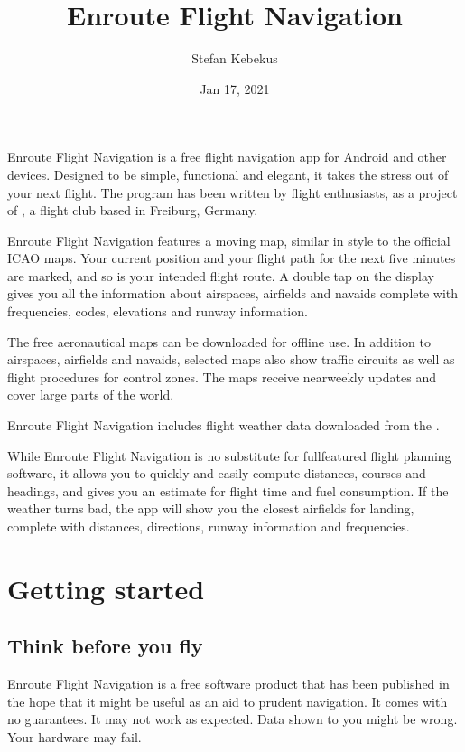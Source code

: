 \documentclass[letterpaper,10pt,english]{sphinxmanual}
\title{Enroute Flight Navigation}
\date{Jan 17, 2021}
\author{Stefan Kebekus}
\let\sphinxpxdimen\pdfpxdimen\else\newdimen\sphinxpxdimen
\begin{document}
\pagestyle{empty}
\sphinxmaketitle
\pagestyle{plain}
\sphinxtableofcontents
\pagestyle{normal}
\label{\detokenize{index::doc}}


\noindent{\hspace*{\fill}\sphinxincludegraphics[width=100\sphinxpxdimen]{{de.akaflieg_freiburg.enroute}.png}\hspace*{\fill}}

Enroute Flight Navigation is a free flight navigation app for Android and other
devices. Designed to be simple, functional and elegant, it takes the stress out
of your next flight. The program has been written by flight enthusiasts, as a
project of , a flight club
based in Freiburg, Germany.

Enroute Flight Navigation features a moving map, similar in style to the
official ICAO maps. Your current position and your flight path for the next five
minutes are marked, and so is your intended flight route. A double tap on the
display gives you all the information about airspaces, airfields and navaids \textendash{}
complete with frequencies, codes, elevations and runway information.

The free aeronautical maps can be downloaded for offline use. In addition to
airspaces, airfields and navaids, selected maps also show traffic circuits as
well as flight procedures for control zones. The maps receive near\sphinxhyphen{}weekly
updates and cover large parts of the world.

Enroute Flight Navigation includes flight weather data downloaded from the
.

While Enroute Flight Navigation is no substitute for full\sphinxhyphen{}featured flight
planning software, it allows you to quickly and easily compute distances,
courses and headings, and gives you an estimate for flight time and fuel
consumption. If the weather turns bad, the app will show you the closest
airfields for landing, complete with distances, directions, runway information
and frequencies.

\part{Getting started}


\chapter{Think before you fly}
\label{\detokenize{01-intro/think:think-before-you-fly}}\label{\detokenize{01-intro/think::doc}}
Enroute Flight Navigation is a free software product that has been published in
the hope that it might be useful as an aid to prudent navigation.  It comes with
no guarantees.  It may not work as expected.  Data shown to you might be wrong.
Your hardware may fail.
\end{document}
